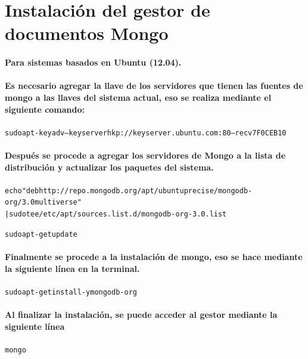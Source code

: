 %
%

\newpage
\section*{Instalación del gestor de documentos Mongo}
	\paragraph{Para sistemas basados en Ubuntu (12.04).}
	\paragraph{Es necesario agregar la llave de los servidores que tienen las fuentes de mongo a las llaves del sistema actual, eso se realiza mediante el siguiente comando:}
	\begin{alltt}
		sudo apt-key adv --keyserver hkp://keyserver.ubuntu.com:80 --recv 7F0CEB10
	\end{alltt}
	\paragraph{Después se procede a agregar los servidores de Mongo a la lista de distribución y actualizar los paquetes del sistema.}
	\begin{alltt}
		echo "deb http://repo.mongodb.org/apt/ubuntu precise/mongodb-org/3.0 multiverse" 
		| sudo tee /etc/apt/sources.list.d/mongodb-org-3.0.list

		sudo apt-get update
	\end{alltt}
	\paragraph{Finalmente se procede a la instalación de mongo, eso se hace mediante la siguiente línea en la terminal.}
	\begin{alltt}
		sudo apt-get install -y mongodb-org
	\end{alltt}
	\paragraph{Al finalizar la instalación, se puede acceder al gestor mediante la siguiente línea}
	\begin{alltt}
		mongo
	\end{alltt}
